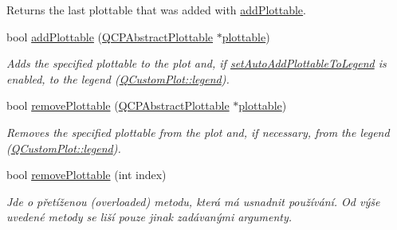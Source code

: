 \begin{DoxyCompactItemize}
\begin{DoxyCompactList}
Returns the last plottable that was added with \hyperlink{classQCustomPlot_ab7ad9174f701f9c6f64e378df77927a6}{add\+Plottable}. \end{DoxyCompactList}\item 
bool \hyperlink{classQCustomPlot_ab7ad9174f701f9c6f64e378df77927a6}{add\+Plottable} (\hyperlink{classQCPAbstractPlottable}{Q\+C\+P\+Abstract\+Plottable} $\ast$\hyperlink{classQCustomPlot_a32de81ff53e263e785b83b52ecd99d6f}{plottable})
\begin{DoxyCompactList}\small\item\em Adds the specified plottable to the plot and, if \hyperlink{classQCustomPlot_ad8858410c2db47b7104040a3aa61c3fc}{set\+Auto\+Add\+Plottable\+To\+Legend} is enabled, to the legend (\hyperlink{classQCustomPlot_a4eadcd237dc6a09938b68b16877fa6af}{Q\+Custom\+Plot\+::legend}). \end{DoxyCompactList}\item 
bool \hyperlink{classQCustomPlot_af3dafd56884208474f311d6226513ab2}{remove\+Plottable} (\hyperlink{classQCPAbstractPlottable}{Q\+C\+P\+Abstract\+Plottable} $\ast$\hyperlink{classQCustomPlot_a32de81ff53e263e785b83b52ecd99d6f}{plottable})
\begin{DoxyCompactList}\small\item\em Removes the specified plottable from the plot and, if necessary, from the legend (\hyperlink{classQCustomPlot_a4eadcd237dc6a09938b68b16877fa6af}{Q\+Custom\+Plot\+::legend}). \end{DoxyCompactList}\item 
\hypertarget{classQCustomPlot_afc210e0021480f8119bccf37839dbcc8}{}bool \hyperlink{classQCustomPlot_afc210e0021480f8119bccf37839dbcc8}{remove\+Plottable} (int index)\label{classQCustomPlot_afc210e0021480f8119bccf37839dbcc8}

\begin{DoxyCompactList}\small\item\em Jde o přetíženou (overloaded) metodu, která má usnadnit používání. Od výše uvedené metody se liší pouze jinak zadávanými argumenty.


\end{DoxyCompactList}
\end{DoxyCompactItemize}
